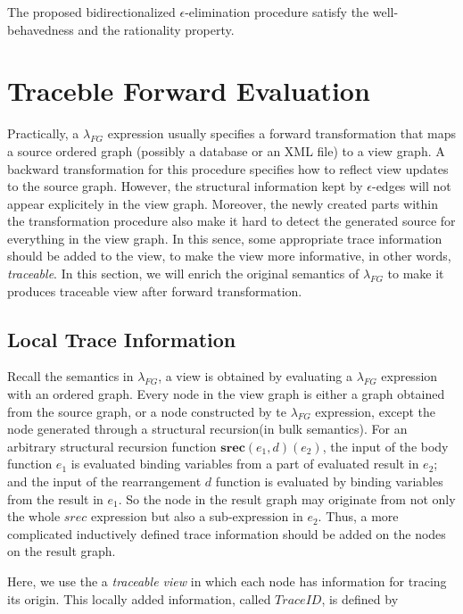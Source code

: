 \documentclass{llncs}
\begin{document}
\begin{lemma}\label{lemma:well-epsilon}
The proposed bidirectionalized $\epsilon$-elimination procedure satisfy the well-behavedness and the rationality property.
\end{lemma}

\section{Traceble Forward Evaluation}\label{sec:fwd}

Practically, a $\lambda_{FG}$ expression usually specifies a forward transformation that maps a source ordered graph (possibly a database or an XML file) to a view graph. A backward transformation for this procedure specifies how to reflect view updates to the source graph. However, the structural information kept by $\epsilon$-edges will not appear explicitely in the view graph. Moreover, the newly created parts within the transformation procedure also make it hard to detect the generated source for everything in the view graph. In this sence, some appropriate trace information should be added to the view, to make the view more informative, in other words, \emph{traceable}. In this section, we will enrich the original semantics of $\lambda_{FG}$ to make it produces traceable view after forward transformation.

\subsection{Local Trace Information}\label{subsec:local}

Recall the semantics in $\lambda_{FG}$, a view is obtained by evaluating a $\lambda_{FG}$ expression with an ordered graph. Every node in the view graph is either a graph obtained from the source graph, or a node constructed by te $\lambda_{FG}$ expression, except the node generated through a structural recursion(in bulk semantics). For an arbitrary structural recursion function $\mathbf{srec}(e_1,d)(e_2)$, the input of the body function $e_1$ is evaluated binding variables from a part of evaluated result in $e_2$; and the input of the rearrangement $d$ function is evaluated by binding variables from the result in $e_1$. So the node in the result graph may originate from not only the whole $srec$ expression but also a sub-expression in $e_2$. Thus, a more complicated inductively defined trace information should be added on the nodes on the result graph.

Here, we use the a \emph{traceable view} in which each node has information for tracing its origin. This locally added information, called $TraceID$, is defined by
\end{document}
